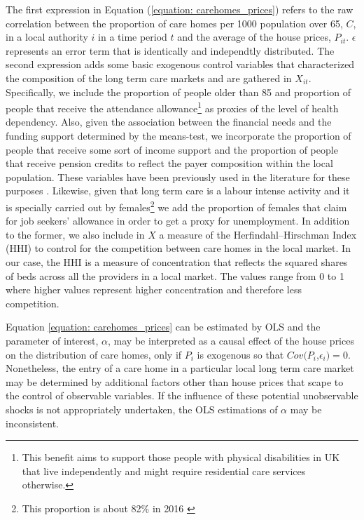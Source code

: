 \documentclass[12pt,letterpaper]{article}
\begin{document}
The first expression in Equation (\ref{equation: carehomes_prices}) refers to the raw correlation between the
 proportion of care homes per 1000 population over 65,  $C$, in a local authority $i$ in a time period $t$ 
 and the average of the house prices, $P_{it}$. $\epsilon$ represents an error term that is identically and independtly distributed. 
The second expression adds some basic exogenous control variables that 
characterized the composition of the long term care markets and are gathered in 
$X_{it}$.  Specifically, we include the proportion 
  of people older than 85 and proportion of people that receive the attendance 
  allowance\footnote{This benefit aims to support those people with physical disabilities in UK that live
   independently and might require residential care services otherwise. } as proxies of the level 
   of health dependency. Also, given the association between the financial needs and the funding
    support determined by the means-test, we incorporate the proportion of people that receive some
     sort of income support and the proportion of people that receive pension credits to reflect the payer 
     composition within the local population. These variables have been previously used in the literature for these purposes 
     \citep{darton2010slicing, forder2014}. Likewise, given that long term care is a labour intense 
     activity and it is specially carried out by females\footnote{This proportion is about 82\% in 2016 \citep{workforce2016}}
      we add the proportion of females that claim for job seekers’ allowance in order to get a proxy for 
      unemployment. In addition to the former, we also include in $X$ a measure of the Herfindahl–Hirschman Index (HHI) to control for
      the competition between care homes in the local market. In our case, the HHI is a measure of concentration that 
      reflects the squared shares of beds across all the providers in a local market. The values range from
       0 to 1 where higher values represent higher concentration and therefore less competition.  
 
Equation \ref{equation: carehomes_prices} can be estimated by OLS and the parameter of interest, $\alpha$,  may be interpreted as a causal effect
  of the house prices on the distribution of care homes, only if
         $P_i$ is exogenous so that $Cov(P_{i}$,$\epsilon_{i}) = 0 $. 
         Nonetheless, the entry of a care home in a particular local long term 
         care market may be determined by additional factors other than house 
         prices that scape to the control of observable variables. If the 
         influence of these potential unobservable shocks is not appropriately 
         undertaken, the OLS estimations of $\alpha$ may be inconsistent. 
         
\end{document}
